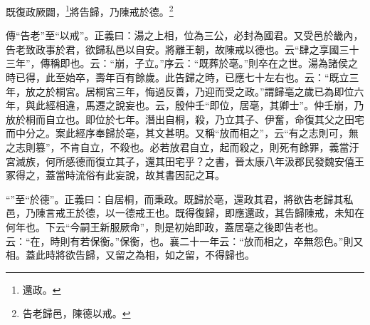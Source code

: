 既復政厥闢，\footnote{還政。}將告歸，乃陳戒於德。\footnote{告老歸邑，陳德以戒。}


{\noindent\zhuan{}\fzbyks 傳“告老”至“以戒”。正義曰：湯之上相，位為三公，必封為國君。又受邑於畿內，告老致政事於君，欲歸私邑以自安。將離王朝，故陳戒以德也。云“肆之享國三十三年”，傳稱即也。云：“崩，子立。”序云：“既葬於亳。”則卒在之世。湯為諸侯之時已得，此至始卒，壽年百有餘歲。此告歸之時，已應七十左右也。云：“既立三年，放之於桐宮。居桐宮三年，悔過反善，乃迎而受之政。”謂歸亳之歲已為即位六年，與此經相違，馬遷之說妄也。云，殷仲壬“即位，居亳，其卿士”。仲壬崩，乃放於桐而自立也。即位於七年。潛出自桐，殺，乃立其子、伊奮，命復其父之田宅而中分之。案此經序奉歸於亳，其文甚明。又稱“放而相之”，云“有之志則可，無之志則篡”，不肯自立，不殺也。必若放君自立，起而殺之，則死有餘罪，義當汙宮滅族，何所感德而復立其子，還其田宅乎？之書，晉太康八年汲郡民發魏安僖王冢得之，蓋當時流俗有此妄說，故其書因記之耳。 \par}

{\noindent\shu{}\fzkt “”至“於德”。正義曰：自居桐，而秉政。既歸於亳，還政其君，將欲告老歸其私邑，乃陳言戒王於德，以一德戒王也。既得復歸，即應還政，其告歸陳戒，未知在何年也。下云“今嗣王新服厥命”，則是初始即政，蓋居亳之後即告老也。云：“在，時則有若保衡。”保衡，也。襄二十一年云：“放而相之，卒無怨色。”則又相。蓋此時將欲告歸，又留之為相，如之留，不得歸也。 \par}


